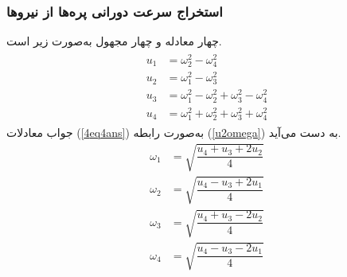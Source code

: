 \subsubsection{استخراج سرعت دورانی پره‌ها از نیروها}
چهار معادله و چهار مجهول به‌صورت زیر است.
\begin{align}\label{4eq4ans}
	\begin{split}
		u_1 &= \omega_2^2 - \omega_4^2\\
		u_2 &= \omega_1^2 - \omega_3^2\\
		u_3 &= \omega_1^2 - \omega_2^2  + \omega_3^2 - \omega_4^2\\
		u_4 &= \omega_1^2 + \omega_2^2  + \omega_3^2 + \omega_4^2
	\end{split}
\end{align}
جواب معادلات 
(\ref{4eq4ans})
به‌صورت رابطه 
(\ref{u2omega})
به دست می‌آید.
\begin{equation}\label{u2omega}
	\begin{split}
		\omega_1 &= \sqrt{\dfrac{u_4 + u_3 +2u_2}{4}}\\[1em]
		\omega_2 &= \sqrt{\dfrac{u_4 - u_3 +2u_1}{4}}\\[1em]
		\omega_3 &= \sqrt{\dfrac{u_4 + u_3 -2u_2}{4}}\\[1em]
		\omega_4 &= \sqrt{\dfrac{u_4 - u_3 -2u_1}{4}}
	\end{split}
\end{equation}
